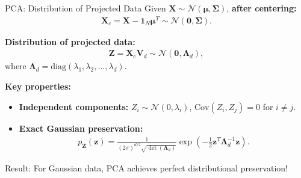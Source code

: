 \documentclass{beamer}
\begin{document}
\begin{frame}{PCA: Distribution of Projected Data}
 Given $\mathbf{X} \sim \mathcal{N}(\boldsymbol{\mu},
 \boldsymbol{\Sigma})$, \textbf{after centering:}
 \begin{align*}
   \mathbf{X}_c = \mathbf{X} - \mathbf{1}_N\boldsymbol{\mu}^T \sim \mathcal{N}(\mathbf{0}, \boldsymbol{\Sigma}).
 \end{align*}
 
 \textbf{Distribution of projected data:}
 \begin{align*}
   \mathbf{Z} = \mathbf{X}_c\mathbf{V}_d \sim \mathcal{N}(\mathbf{0}, \boldsymbol{\Lambda}_d),
 \end{align*}
 where $\boldsymbol{\Lambda}_d = \text{diag}(\lambda_1, \lambda_2, \ldots, \lambda_d)$.
 
 \textbf{Key properties:}
 \begin{itemize}
   \item \textbf{Independent components:} $Z_i \sim \mathcal{N}(0, \lambda_i)$, $\text{Cov}(Z_i, Z_j) = 0$ for $i \neq j$.
   \item \textbf{Exact Gaussian preservation:} 
   \begin{align*}
     p_{\mathbf{Z}}(\mathbf{z}) = \frac{1}{(2\pi)^{d/2}\sqrt{\det(\boldsymbol{\Lambda}_d)}} \exp\left(-\frac{1}{2}\mathbf{z}^T\boldsymbol{\Lambda}_d^{-1}\mathbf{z}\right).
   \end{align*}
 \end{itemize}
  \alert{Result: For Gaussian data, PCA achieves perfect distributional preservation!}
  \end{frame}
\end{document}
